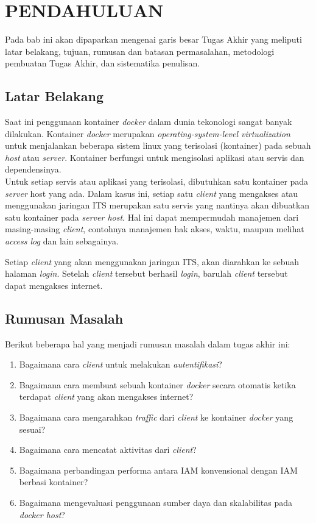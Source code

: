 \chapter{PENDAHULUAN}
Pada bab ini akan dipaparkan mengenai garis besar Tugas Akhir yang meliputi latar belakang, tujuan, rumusan dan batasan permasalahan, metodologi pembuatan Tugas Akhir, dan sistematika penulisan.

\section{Latar Belakang}
Saat ini penggunaan kontainer \textit{docker} dalam dunia tekonologi sangat banyak dilakukan. Kontainer \textit{docker} merupakan \textit{operating-system-level virtualization} untuk menjalankan beberapa sistem linux yang terisolasi (kontainer) pada sebuah \textit{host} atau \textit{server}. Kontainer berfungsi untuk mengisolasi aplikasi atau servis dan dependensinya.\\
\indent Untuk setiap servis atau aplikasi yang terisolasi, dibutuhkan satu kontainer pada \textit{server} host yang ada. Dalam kasus ini, setiap satu \textit{client} yang mengakses atau menggunakan jaringan ITS merupakan satu servis yang nantinya akan dibuatkan satu kontainer pada \textit{server host}. Hal ini dapat mempermudah manajemen dari masing-masing \textit{client}, contohnya manajemen hak akses, waktu, maupun melihat \textit{access log} dan lain sebagainya.

Setiap \textit{client} yang akan menggunakan jaringan ITS, akan diarahkan ke sebuah halaman \textit{login}. Setelah \textit{client} tersebut berhasil \textit{login}, barulah \textit{client} tersebut dapat mengakses internet.

\section{Rumusan Masalah}
Berikut beberapa hal yang menjadi rumusan masalah dalam tugas akhir ini:
\begin{enumerate}
	\item Bagaimana cara \textit{client} untuk melakukan \textit{autentifikasi}?
	\item Bagaimana cara membuat sebuah kontainer \textit{docker} secara otomatis ketika terdapat \textit{client} yang akan mengakses internet?
	\item Bagaimana cara mengarahkan \textit{traffic} dari \textit{client} ke kontainer \textit{docker} yang sesuai?
	\item Bagaimana cara mencatat aktivitas dari \textit{client}?
	\item Bagaimana perbandingan performa antara IAM konvensional dengan IAM berbasi kontainer?
	\item Bagaimana mengevaluasi penggunaan sumber daya dan skalabilitas pada \textit{docker host}?
\end{enumerate}

